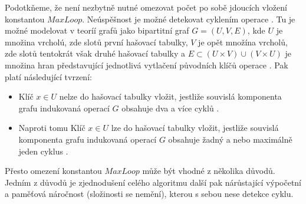 Podotkňeme, že není nezbytně nutné omezovat počet po sobě jdoucích vložení konstantou $MaxLoop$. Neúspěšnost je 
možné detekovat cyklením operace . Tu je možné modelovat v teoríí grafů jako bipartitní graf $G=(U,V,E)$, 
kde $U$ je množina vrcholú, zde slotů první hašovací tabulky, $V$ je opět množína vrcholů, zde slotů tentokrát však druhé
hašovací tabulky a $E \subset (U \times V) \cup (V \times U)$ je množina hran představující jednotlivá vytlačení původních
klíčů operace . Pak platí následující tvrzení:
\begin{itemize}
	\item Klíč $x \in U$ nelze do hašovací tabulky vložit, jestliže souvislá komponenta grafu indukovaná operací
		 $G$ obsahuje dva a více cyklů
		\cite{standford1}. 
	\item Naproti tomu Klíč $x \in U$ lze do hašovací tabulky vložit, jestliže souvislá komponenta grafu indukovaná operací
		 $G$ obsahuje žadný
		a nebo maximálně jeden cyklus \cite{standford1}.
\end{itemize}
Přesto omezení konstantou $MaxLoop$ může být vhodné z několika důvodů. Jedním z důvodů je zjednodušení celého algoritmu
další pak nárůstající výpočetní a paměťová náročnost (složinosti se nemění), kterou s sebou nese detekce cyklu.

